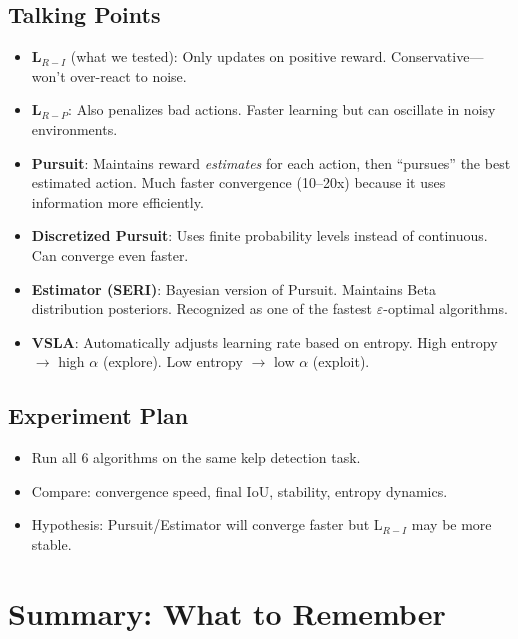 \documentclass[11pt]{article}
\newenvironment{talkingpoints}{%
  \begin{itemize}[leftmargin=1.5em, itemsep=0.3em]
}{%
  \end{itemize}
}
\begin{document}
\subsection{Talking Points}

\begin{talkingpoints}
  \item \textbf{L$_{R-I}$} (what we tested): Only updates on positive reward. Conservative---won't over-react to noise.
  \item \textbf{L$_{R-P}$}: Also penalizes bad actions. Faster learning but can oscillate in noisy environments.
  \item \textbf{Pursuit}: Maintains reward \textit{estimates} for each action, then ``pursues'' the best estimated action. Much faster convergence (10--20x) because it uses information more efficiently.
  \item \textbf{Discretized Pursuit}: Uses finite probability levels instead of continuous. Can converge even faster.
  \item \textbf{Estimator (SERI)}: Bayesian version of Pursuit. Maintains Beta distribution posteriors. Recognized as one of the fastest $\varepsilon$-optimal algorithms.
  \item \textbf{VSLA}: Automatically adjusts learning rate based on entropy. High entropy $\rightarrow$ high $\alpha$ (explore). Low entropy $\rightarrow$ low $\alpha$ (exploit).
\end{talkingpoints}

\subsection{Experiment Plan}

\begin{talkingpoints}
  \item Run all 6 algorithms on the same kelp detection task.
  \item Compare: convergence speed, final IoU, stability, entropy dynamics.
  \item Hypothesis: Pursuit/Estimator will converge faster but L$_{R-I}$ may be more stable.
\end{talkingpoints}

\section{Summary: What to Remember}
\end{document}
